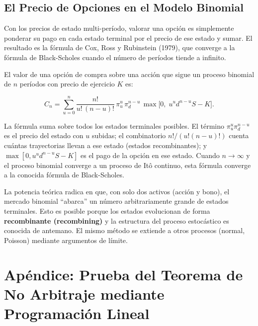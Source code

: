 \documentclass[12pt]{article}
\begin{document}
\subsection{El Precio de Opciones en el Modelo Binomial}

\begin{intuicion}
Con los precios de estado multi-per\'iodo, valorar una opci\'on es simplemente ponderar su pago en cada estado terminal por el precio de ese estado y sumar. El resultado es la f\'ormula de Cox, Ross y Rubinstein (1979), que converge a la f\'ormula de Black-Scholes cuando el n\'umero de per\'iodos tiende a infinito.
\end{intuicion}

El valor de una opci\'on de compra sobre una acci\'on que sigue un proceso binomial de $n$ per\'iodos con precio de ejercicio $K$ es:

\begin{equation}
  C_n = \sum_{u=0}^{n} \frac{n!}{u!\,(n-u)!}\,\pi_u^u\,\pi_d^{n-u}\,\max\!\bigl[0,\;u^u d^{n-u} S - K\bigr].
  \label{eq:opcionbinomial}
\end{equation}

\begin{intuicionmat}
La f\'ormula suma sobre todos los estados terminales posibles. El t\'ermino $\pi_u^u \pi_d^{n-u}$ es el precio del estado con $u$ subidas; el combinatorio $n!/(u!(n-u)!)$ cuenta cu\'antas trayectorias llevan a ese estado (estados recombinantes); y $\max[0, u^u d^{n-u} S - K]$ es el pago de la opci\'on en ese estado. Cuando $n \to \infty$ y el proceso binomial converge a un proceso de It\^o continuo, esta f\'ormula converge a la conocida f\'ormula de Black-Scholes.
\end{intuicionmat}

La potencia te\'orica radica en que, con solo dos activos (acci\'on y bono), el mercado binomial ``abarca'' un n\'umero arbitrariamente grande de estados terminales. Esto es posible porque los estados evolucionan de forma \textbf{recombinante (recombining)} y la estructura del proceso estoc\'astico es conocida de antemano. El mismo m\'etodo se extiende a otros procesos (normal, Poisson) mediante argumentos de l\'imite.

\section{Ap\'endice: Prueba del Teorema de No Arbitraje mediante Programaci\'on Lineal}
\end{document}
